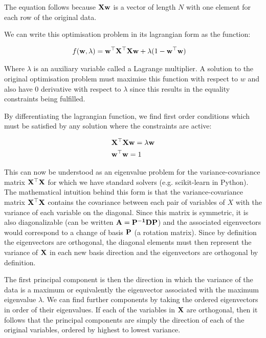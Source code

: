 The equation follows because $\bold{Xw}$ is a vector of length $N$ with one element for each row of the original data.

We can write this optimisation problem in its lagrangian form as the function:

\begin{align}
     & f(\bold{w},\lambda)=\bold{w^{\top}X^{\top}}\bold{Xw} + \lambda(1-\bold{w^{\top}w})
\end{align}

Where $\lambda$ is an auxiliary variable called a Lagrange multiplier. A solution to the original optimisation problem must maximise this function with respect to $w$ and also have 0 derivative with respect to $\lambda$ since this results in the equality constraints being fulfilled.

By differentiating the lagrangian function, we find first order conditions which must be satisfied by any solution where the constraints are active:

\begin{align}
     & \bold{X^{\top}}\bold{Xw}=\lambda \bold{w} \\
     & \bold{w^{\top}w}=1
\end{align}

This can now be understood as an eigenvalue problem for the variance-covariance matrix $\bold{X^{\top}X}$ for which we have standard solvers (e.g. scikit-learn in Python\cite{pedregosa2011scikit}). The mathematical intuition behind this form is that the variance-covariance matrix $\bold{X^{\top}X}$ contains the covariance between each pair of variables of $X$ with the variance of each variable on the diagonal. Since this matrix is symmetric, it is also diagonalizable (can be written $\bold{A=P^{-1}DP}$) and the associated eigenvectors would correspond to a change of basis $\bold{P}$ (a rotation matrix). Since by definition the eigenvectors are orthogonal, the diagonal elements must then represent the variance of $\bold{X}$ in each new basis direction and the eigenvectors are orthogonal by definition.

The first principal component is then the direction in which the variance of the data is a maximum or equivalently the eigenvector associated with the maximum eigenvalue $\lambda$. We can find further components by taking the ordered eigenvectors in order of their eigenvalues. If each of the variables in $\bold{X}$ are orthogonal, then it follows that the principal components are simply the direction of each of the original variables, ordered by highest to lowest variance.

